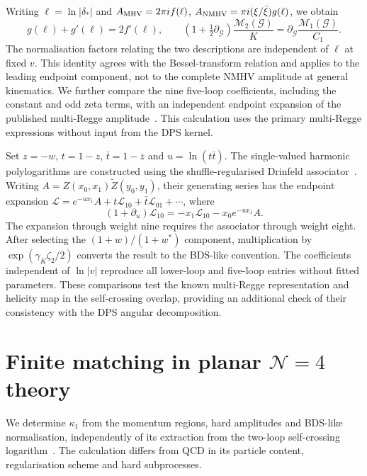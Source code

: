 \documentclass[%
 onecolumn,
 superscriptaddress,
 preprintnumbers,
 nofootinbib,
 amsmath,amssymb,
 aps,
 prl,
]{revtex4-2}
\newcommand{\G}{\mathcal G}
\newcommand{\M}{\mathcal M}
\begin{document}
Writing $\ell=\ln|\delta_*|$ and
$A_{\rm MHV}=2\pi i f(\ell)$,
$A_{\rm NMHV}=\pi i(\xi/\bar\xi)g(\ell)$,
we obtain
\begin{equation}
g(\ell)+g'(\ell)=2f'(\ell),
\qquad
\left(1+\tfrac12\partial_{\G}\right)
\frac{\M_2(\G)}K=
\partial_{\G}\frac{\M_1(\G)}{C_1}.
\label{eq:n4knownflip}
\end{equation}
The normalisation factors relating
the two descriptions are independent
of $\ell$ at fixed $v$.
This identity agrees with the
Bessel-transform relation and applies
to the leading endpoint component,
not to the complete NMHV amplitude
at general kinematics.
%
We further compare the nine five-loop
coefficients, including the constant
and odd zeta terms, with an independent
endpoint expansion of the published
multi-Regge amplitude~\cite{CaronHuot:2019vjl}.
This calculation uses the primary
multi-Regge expressions without
input from the DPS kernel.

Set $z=-w$, $t=1-z$,
$\bar t=1-\bar z$ and
$u=\ln(t\bar t)$.
The single-valued harmonic polylogarithms
are constructed using the
shuffle-regularised Drinfeld associator~\cite{Dixon:2012yy}.
Writing
$A=Z(x_0,x_1)\widetilde Z(y_0,y_1)$,
their generating series has the
endpoint expansion
$\mathcal L=e^{-u x_1}A+
t\mathcal L_{10}+\bar t\mathcal L_{01}
+\cdots$, where
\begin{equation}
(1+\partial_u)\mathcal L_{10}
=-x_1\mathcal L_{10}-x_0e^{-u x_1}A.
\label{eq:n4endpoint}
\end{equation}
%
The expansion through weight nine
requires the associator through weight
eight. After selecting the
$(1+w)/(1+w^*)$ component,
multiplication by
$\exp(\gamma_K\zeta_2/2)$ converts
the result to the BDS-like convention.
%
The coefficients independent of
$\ln|v|$ reproduce all
\nFourNmhvLower{} lower-loop and
\nFourNmhvFiveCount{} five-loop
entries without fitted parameters.
These comparisons test the known
multi-Regge representation and
helicity map in the self-crossing
overlap, providing an additional
check of their consistency with
the DPS angular decomposition.





\section{Finite matching in planar \texorpdfstring{$\mathcal N=4$}{N=4} theory}
\label{sec:n4regions}

We determine $\kappa_1$ from the momentum regions,
hard amplitudes and BDS-like normalisation, independently
of its extraction from the two-loop self-crossing
logarithm~\cite{Dixon:2016epj}. The calculation differs
from QCD in its particle content, regularisation scheme
and hard subprocesses.
\end{document}
